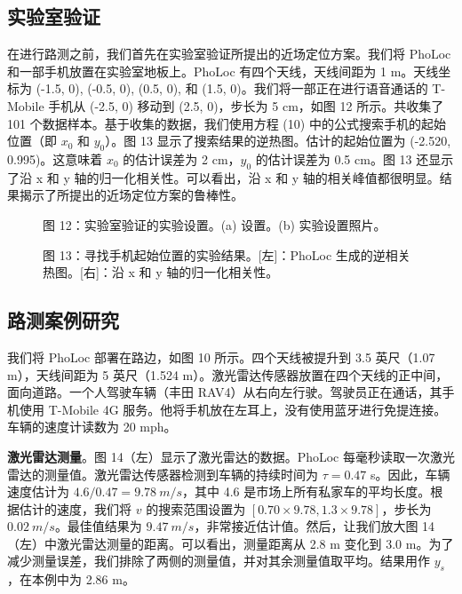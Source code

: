 \documentclass[journal, onecolumn]{IEEEtran}
\begin{document}
\subsection{实验室验证}
在进行路测之前，我们首先在实验室验证所提出的近场定位方案。我们将 PhoLoc 和一部手机放置在实验室地板上。PhoLoc 有四个天线，天线间距为 1 m。天线坐标为 (-1.5, 0), (-0.5, 0), (0.5, 0), 和 (1.5, 0)。我们将一部正在进行语音通话的 T-Mobile 手机从 (-2.5, 0) 移动到 (2.5, 0)，步长为 5 cm，如图 12 所示。共收集了 101 个数据样本。基于收集的数据，我们使用方程 (10) 中的公式搜索手机的起始位置（即 $x_{0}$ 和 $y_{0}$）。图 13 显示了搜索结果的逆热图。估计的起始位置为 (-2.520, 0.995)。这意味着 $x_{0}$ 的估计误差为 2 cm，$y_{0}$ 的估计误差为 0.5 cm。图 13 还显示了沿 x 和 y 轴的归一化相关性。可以看出，沿 x 和 y 轴的相关峰值都很明显。结果揭示了所提出的近场定位方案的鲁棒性。

\begin{figure}[htbp]
\centering
\caption{图 12：实验室验证的实验设置。(a) 设置。(b) 实验设置照片。}
\label{fig:12}
\end{figure}

\begin{figure}[htbp]
\centering
\caption{图 13：寻找手机起始位置的实验结果。[左]：PhoLoc 生成的逆相关热图。[右]：沿 x 和 y 轴的归一化相关性。}
\label{fig:13}
\end{figure}

\subsection{路测案例研究}
我们将 PhoLoc 部署在路边，如图 10 所示。四个天线被提升到 3.5 英尺（1.07 m），天线间距为 5 英尺（1.524 m）。激光雷达传感器放置在四个天线的正中间，面向道路。一个人驾驶车辆（丰田 RAV4）从右向左行驶。驾驶员正在通话，其手机使用 T-Mobile 4G 服务。他将手机放在左耳上，没有使用蓝牙进行免提连接。车辆的速度计读数为 20 mph。

\textbf{激光雷达测量}。图 14（左）显示了激光雷达的数据。PhoLoc 每毫秒读取一次激光雷达的测量值。激光雷达传感器检测到车辆的持续时间为 $\tau=0.47$ s。因此，车辆速度估计为 $4.6/0.47=9.78~m/s$，其中 4.6 是市场上所有私家车的平均长度。根据估计的速度，我们将 $v$ 的搜索范围设置为 $[0.70\times9.78, 1.3\times9.78]$，步长为 $0.02~m/s$。最佳值结果为 $9.47~m/s$，非常接近估计值。然后，让我们放大图 14（左）中激光雷达测量的距离。可以看出，测量距离从 2.8 m 变化到 3.0 m。为了减少测量误差，我们排除了两侧的测量值，并对其余测量值取平均。结果用作 $y_{s}$，在本例中为 2.86 m。
\end{document}
